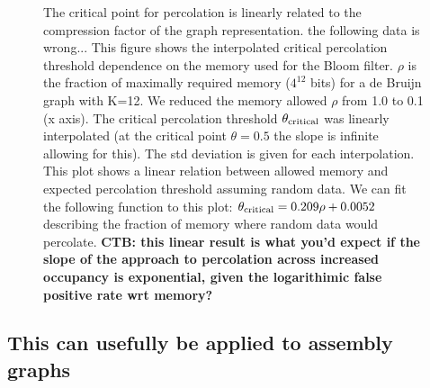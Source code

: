 \documentclass[12pt]{article} \usepackage{simplemargins}
\begin{document}
\begin{figure}
\caption{The critical point for percolation is linearly related to the
  compression factor of the graph representation.
  the following data is wrong...
This figure shows
  the interpolated critical percolation threshold dependence on the
  memory used for the Bloom filter. $\rho$ is the fraction of
  maximally required memory ($4^{12}$ bits) for a de Bruijn graph with
  K=12. We reduced the memory allowed $\rho$ from 1.0 to 0.1 (x
  axis). The critical percolation threshold $\theta_{\rm critical}$
  was linearly interpolated (at the critical point $\theta=0.5$ the
  slope is infinite allowing for this). The std deviation is given for
  each interpolation. This plot shows a linear relation between
  allowed memory and expected percolation threshold assuming random
  data. We can fit the following function to this plot: $\theta_{\rm
    critical} = 0.209 \rho + 0.0052$ describing the fraction of memory
  where random data would percolate.  {\bf CTB: this linear result is
    what you'd expect if the slope of the approach to percolation
    across increased occupancy is exponential, given the logarithimic
    false positive rate wrt memory?}}

\end{figure}

\subsection{This can usefully be applied to assembly graphs}
\end{document}
